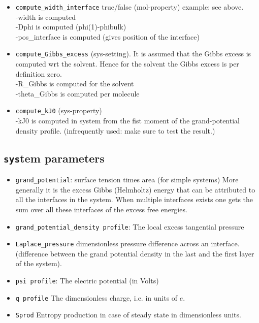 \documentclass{article}
\begin{document}
\begin{itemize}
\item {\tt compute\_width\_interface} {true/false} (mol-property) example: see above. \\
-width is computed\\
-Dphi is computed (phi(1)-phibulk)\\
-pos\_interface is computed (gives position of the interface)

\item {\tt compute\_Gibbs\_excess}  (sys-setting). It is assumed that the Gibbs excess is computed wrt the solvent. Hence for the solvent the Gibbs excess is per definition zero.\\ 
-R\_Gibbs is computed for the solvent\\
-theta\_Gibbs is computed per molecule

\item{\tt compute\_kJ0} (sys-property)\\
-kJ0 is computed in system from the fist moment of the grand-potential density profile. (infrequently used: make sure to test the result.)
\end{itemize}

\subsection{{\tt sys}tem parameters}
\begin{itemize}

\item{\tt grand\_potential}: surface tension times area (for simple systems) More generally it is the excess Gibbs (Helmholtz) energy that can be attributed to all the interfaces in the system. When multiple interfaces exists one gets the sum over all these interfaces of the excess free energies.
\item{\tt grand\_potential\_density profile}: The local excess tangential pressure 
\item{\tt Laplace\_pressure} dimensionless pressure difference across an interface. (difference between the grand potential density in the last and the first layer of the system).
\item{\tt psi profile}: The electric potential (in Volts) 
\item{\tt q profile} The dimensionless charge, i.e.  in units of $e$. 
\item{\tt Sprod} Entropy production in case of steady state in dimensionless units.
\end{itemize}
\end{document}
